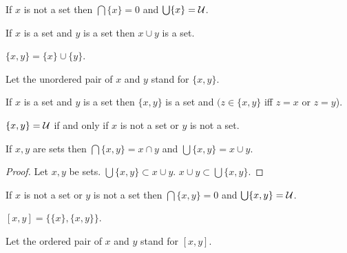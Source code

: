 \documentclass[a4paper,draft]{amsproc}
\begin{document}
\begin{forthel}
\begin{theorem}
If $x$ is not a set then $\bigcap \{x\} = 0$
and $\bigcup \{x\} = \cal{U}$.
\end{theorem}

\begin{axiom}
If $x$ is a set and $y$ is a set then $x \cup y$ is a set.
\end{axiom}

\begin{definition} $\{x,y\} = \{x\} \cup \{y\}$.\end{definition}
Let the unordered pair of $x$ and $y$ stand for $\{x,y\}$.


\begin{theorem}
If $x$ is a set and $y$ is a set 
then $\{x,y\}$ is a set and $(z \in \{x,y\}$ iff $z=x$ or $z=y$). 
\end{theorem}

\begin{theorem}
$\{x,y\} = \cal{U}$ if and only if $x$ is not a set or $y$ is not a set.
\end{theorem}

\begin{theorem}
If $x,y$ are sets then $\bigcap \{x,y\} = x \cap y$
and $\bigcup \{x,y\} = x \cup y$.
\end{theorem}
\begin{proof}
Let $x,y$ be sets.
$\bigcup \{x,y\} \subset x \cup y$.
$x \cup y \subset \bigcup \{x,y\}$.
\end{proof}

\begin{theorem}
If $x$ is not a set or $y$ is not a set then
$\bigcap \{x,y\} = 0$ and $\bigcup \{x,y\} = \cal{U}$.
\end{theorem}


\begin{definition} $[x,y] = \{\{x\},\{x,y\}\}$.\end{definition}
Let the ordered pair of $x$ and $y$ stand for $[x,y]$.


\end{forthel}
\end{document}

